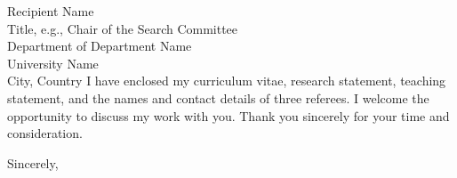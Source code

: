 \begin{letter}{
  Recipient Name \\{}
  Title, e.g., Chair of the Search Committee \\{}
  Department of Department Name \\{}
  University Name \\{}
  City, Country
}
I have enclosed my curriculum vitae, research statement, teaching statement,
and the names and contact details of three referees. I welcome the opportunity
to discuss my work with you. Thank you sincerely for your time and consideration.


\closing{Sincerely,}




\end{letter}


